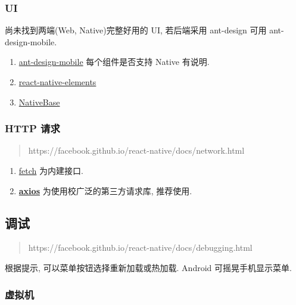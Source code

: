\subsubsection{UI}\label{ui}

尚未找到两端(Web, Native)完整好用的 UI, 若后端采用 ant-design 可用
ant-design-mobile.

\begin{enumerate}
\def\labelenumi{\arabic{enumi}.}
\tightlist
\item
  \href{https://github.com/ant-design/ant-design-mobile}{ant-design-mobile}
  每个组件是否支持 Native 有说明.
\item
  \href{https://github.com/react-native-training/react-native-elements}{react-native-elements}
\item
  \href{https://github.com/GeekyAnts/NativeBase}{NativeBase}
\end{enumerate}

\subsubsection{HTTP 请求}\label{http-ux8bf7ux6c42}

\begin{quote}
https://facebook.github.io/react-native/docs/network.html
\end{quote}

\begin{enumerate}
\def\labelenumi{\arabic{enumi}.}
\tightlist
\item
  \href{https://developer.mozilla.org/en-US/docs/Web/API/Fetch_API}{fetch}
  为内建接口.
\item
  \href{https://github.com/axios/axios}{\textbf{axios}}
  为使用校广泛的第三方请求库, 推荐使用.
\end{enumerate}

\subsection{调试}\label{ux8c03ux8bd5}

\begin{quote}
https://facebook.github.io/react-native/docs/debugging.html
\end{quote}

根据提示, 可以菜单按钮选择重新加载或热加载. Android 可摇晃手机显示菜单.

\subsubsection{虚拟机}\label{ux865aux62dfux673a}

